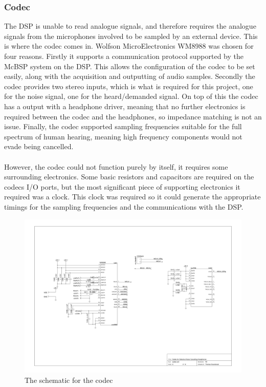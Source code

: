 \subsubsection{Codec}
The DSP is unable to read analogue signals, and therefore requires the analogue signals from the microphones involved to be sampled by an external device.
This is where the codec comes in.
Wolfson MicroElectronics WM8988 was chosen for four reasons.
Firstly it supports a communication protocol supported by the McBSP system on the DSP.
This allows the configuration of the codec to be set easily, along with the acquisition and outputting of audio samples.
Secondly the codec provides two stereo inputs, which is what is required for this project, one for the noise signal, one for the heard/demanded signal.
On top of this the codec has a output with a headphone driver, meaning that no further electronics is required between the codec and the headphones, so impedance matching is not an issue.
Finally, the codec supported sampling frequencies suitable for the full spectrum of human hearing, meaning high frequency components would not evade being cancelled.
\\
\\
However, the codec could not function purely by itself, it requires some surrounding electronics.
Some basic resistors and capacitors are required on the codecs I/O ports, but the most significant piece of supporting electronics it required was a clock.
This clock was required so it could generate the appropriate timings for the sampling frequencies and the communications with the DSP.

\begin{figure}[H]
	\centering
	\includegraphics[width=\textwidth]{./img/codec.png}
	\caption{The schematic for the codec}
	\label{fig:codecsch}
\end{figure}

